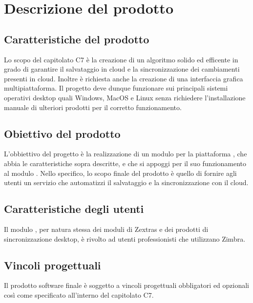 \section{Descrizione del prodotto}
\subsection{Caratteristiche del prodotto}
Lo scopo del capitolato C7 è la creazione di un algoritmo solido ed efficente in grado di garantire il salvataggio in cloud e la sincronizzazione dei cambiamenti presenti in cloud. Inoltre è richiesta anche la creazione di una interfaccia grafica multipiattaforma. Il progetto deve dunque funzionare sui principali sistemi operativi desktop quali Windows, MacOS e Linux senza richiedere l'installazione manuale di ulteriori prodotti per il corretto funzionamento. 
\subsection{Obiettivo del prodotto}
L'obbiettivo del progetto è la realizzazione di un modulo per la piattaforma , che abbia le caratteristiche sopra descritte, e che si appoggi per il suo funzionamento al modulo .
Nello specifico, lo scopo finale del prodotto è quello di fornire agli utenti un servizio che automatizzi il salvataggio e la sincronizzazione con il cloud.
\subsection{Caratteristiche degli utenti}
Il modulo \progetto{}, per natura stessa dei moduli di Zextras e dei prodotti di sincronizzazione desktop, è rivolto ad utenti professionisti che utilizzano Zimbra. 
\subsection{Vincoli progettuali}
Il prodotto software finale è soggetto a vincoli progettuali obbligatori ed opzionali così come specificato all'interno del capitolato C7.